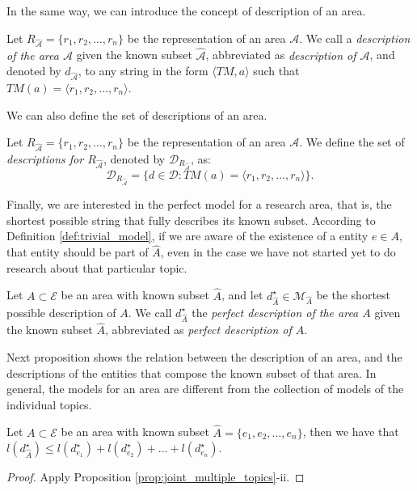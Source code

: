 In the same way, we can introduce the concept of description of an area.

\begin{definition}
Let $R_{\hat{\mathcal{A}}} = \{ r_1, r_2, \ldots, r_n \}$ be the representation of an area $\mathcal{A}$. We call a \emph{description of the area $\mathcal{A}$} given the known subset $\hat{\mathcal{A}}$, abbreviated as \emph{description of $\mathcal{A}$}, and denoted by $d_{\hat{\mathcal{A}}}$, to any string in the form $\langle TM, a\rangle$ such that $TM(a) = \langle r_1, r_2, \ldots, r_n\rangle$.
\end{definition}

We can also define the set of descriptions of an area.

\begin{definition}
Let $R_{\hat{\mathcal{A}}} = \{ r_1, r_2, \ldots, r_n \}$ be the representation of an area $\mathcal{A}$. We define the set of \emph{descriptions for $R_{\hat{\mathcal{A}}}$}, denoted by $\mathcal{D}_{R_{\hat{\mathcal{A}}}}$, as:
\[
\mathcal{D}_{R_{\hat{\mathcal{A}}}} = \{ d \in \mathcal{D} : TM(a) = \langle r_1, r_2, \ldots, r_n\rangle \}.
\]
\end{definition}

Finally, we are interested in the perfect model for a research area, that is, the shortest possible string that fully describes its known subset. According to Definition \ref{def:trivial_model}, if we are aware of the existence of a entity $e \in A$, that entity should be part of $\hat{A}$, even in the case we have not started yet to do research about that particular topic.

\begin{definition}
Let $A \subset \mathcal{E}$ be an area with known subset $\hat{A}$, and let $d_{\hat{A}}^{\star} \in \mathcal{M}_{\hat{A}}$ be the shortest possible description of $A$. We call  $d_{\hat{A}}^{\star}$ the \emph{perfect description of the area $A$} given the known subset $\hat{A}$, abbreviated as \emph{perfect description of $A$}.
\end{definition}

Next proposition shows the relation between the description of an area, and the descriptions of the entities that compose the known subset of that area. In general, the models for an area are different from the collection of models of the individual topics.

\begin{proposition}
Let $A \subset \mathcal{E}$ be an area with known subset $\hat{A} = \{e_1, e_2, \ldots, e_n\}$, then we have that $l \left( d_{\hat{A}}^{\star} \right) \leq l(d_ {e_1}^\star) + l(d_ {e_2}^\star) + \ldots + l(d_ {e_n}^\star)$.
\end{proposition}
\begin{proof}
Apply Proposition \ref{prop:joint_multiple_topics}-ii. 
\end{proof}

